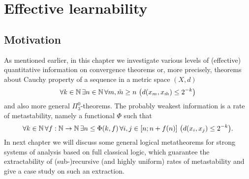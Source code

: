 \section{Effective learnability}

%
%

\subsection*{Motivation}

As mentioned earlier, in this chapter we investigate 
various levels of (effective) quantitative 
information on convergence theorems or, more precisely,
theorems about Cauchy property of a sequence 
in a metric space $(X,d)$
\[
\forall k\in\mathbb{N}\,\exists n\in\mathbb{N}\,\forall m,\tilde{m}\ge n
\ \big( d(x_m,
x_{\tilde{m}})\le 2^{-k}\big) 
\]
and also more general $\Pi^0_3$-theorems.  
The probably weakest information is 
a rate of metastability, namely a functional 
$\Phi$ such that 
\[\forall k\in\mathbb{N}\,\forall f:\mathbb{N}\to\mathbb{N}\, \exists n\le \Phi(k,f) 
\,\forall i,j \in [n;n+f(n)]\ \big( d(x_i,x_j)\le 2^{-k}\big). \]
In next chapter we will discuss some general logical metatheorems for 
strong systems of analysis based 
on full classical logic, which guarantee the extractability of (sub-)recursive 
(and highly uniform) rates of metastability and give
a case study on such an extraction.

